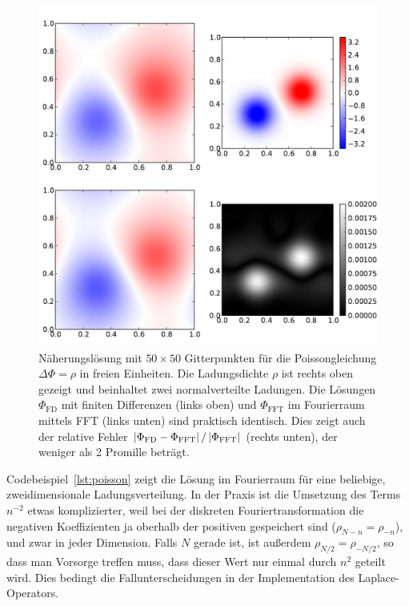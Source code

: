 \begin{figure}
  \centering
  \includegraphics[width=\textwidth]{plots/poisson}
  \caption{Näherungslösung mit $50\times 50$ Gitterpunkten für die
    Poissongleichung $\Delta \Phi=\rho$ in freien
    Einheiten. Die Ladungsdichte $\rho$ ist rechts oben gezeigt
    und beinhaltet zwei normalverteilte Ladungen. Die Lösungen
    $\Phi_\text{FD}$ mit finiten Differenzen (links oben) und
    $\Phi_\text{FFT}$ im Fourierraum mittels FFT (links unten) sind
    praktisch identisch. Dies zeigt auch der relative Fehler
    $\left\lvert{\Phi_\text{FD} - \Phi_\text{FFT}}\right\rvert/\left\lvert{\Phi_\text{FFT}}\right\rvert$
    (rechts unten), der weniger als 2 Promille beträgt.}
  \label{fig:poisson}
\end{figure}

Codebeispiel~\ref{lst:poisson} zeigt die Lösung im Fourierraum für
eine beliebige, zweidimensionale Ladungsverteilung. In der Praxis ist
die Umsetzung des Terms $n^{-2}$ etwas komplizierter, weil bei der
diskreten Fouriertransformation die negativen Koeffizienten ja
oberhalb der positiven gespeichert sind ($\rho_{N-n}=\rho_{-n}$), und
zwar in jeder Dimension. Falls $N$ gerade ist, ist außerdem
$\rho_{N/2} = \rho_{-N/2}$, so dass man Vorsorge treffen muss, dass
dieser Wert nur einmal durch $n^2$ geteilt wird. Dies bedingt die
Fallunterscheidungen in der Implementation des Laplace-Operators.

